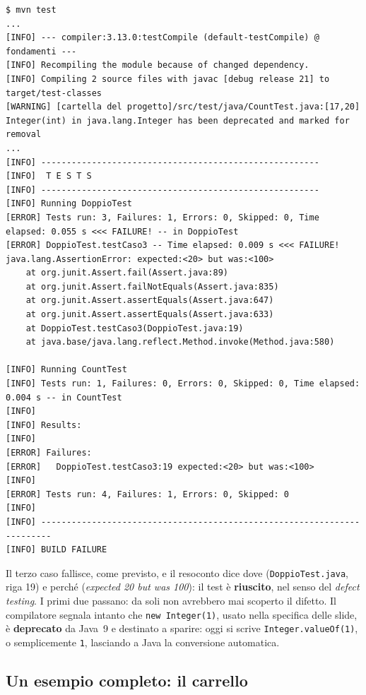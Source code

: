\begin{lstlisting}[style=shell, name=Terminale, deletekeywords={java}]
$ mvn test
...
[INFO] --- compiler:3.13.0:testCompile (default-testCompile) @ fondamenti ---
[INFO] Recompiling the module because of changed dependency.
[INFO] Compiling 2 source files with javac [debug release 21] to target/test-classes
[WARNING] [cartella del progetto]/src/test/java/CountTest.java:[17,20] Integer(int) in java.lang.Integer has been deprecated and marked for removal
...
[INFO] -------------------------------------------------------
[INFO]  T E S T S
[INFO] -------------------------------------------------------
[INFO] Running DoppioTest
[ERROR] Tests run: 3, Failures: 1, Errors: 0, Skipped: 0, Time elapsed: 0.055 s <<< FAILURE! -- in DoppioTest
[ERROR] DoppioTest.testCaso3 -- Time elapsed: 0.009 s <<< FAILURE!
java.lang.AssertionError: expected:<20> but was:<100>
    at org.junit.Assert.fail(Assert.java:89)
    at org.junit.Assert.failNotEquals(Assert.java:835)
    at org.junit.Assert.assertEquals(Assert.java:647)
    at org.junit.Assert.assertEquals(Assert.java:633)
    at DoppioTest.testCaso3(DoppioTest.java:19)
    at java.base/java.lang.reflect.Method.invoke(Method.java:580)

[INFO] Running CountTest
[INFO] Tests run: 1, Failures: 0, Errors: 0, Skipped: 0, Time elapsed: 0.004 s -- in CountTest
[INFO]
[INFO] Results:
[INFO]
[ERROR] Failures:
[ERROR]   DoppioTest.testCaso3:19 expected:<20> but was:<100>
[INFO]
[ERROR] Tests run: 4, Failures: 1, Errors: 0, Skipped: 0
[INFO]
[INFO] ------------------------------------------------------------------------
[INFO] BUILD FAILURE
\end{lstlisting}

Il terzo caso fallisce, come previsto, e il resoconto dice dove (\texttt{DoppioTest.java}, riga 19) e perché
(\textit{expected 20 but was 100}): il test è \textbf{riuscito}, nel senso del \textit{defect testing}. I primi due
passano: da soli non avrebbero mai scoperto il difetto. Il compilatore segnala intanto che \texttt{new Integer(1)}, usato
nella specifica delle slide, è \textbf{deprecato} da Java~9 e destinato a sparire: oggi si scrive
\texttt{Integer.valueOf(1)}, o semplicemente \texttt{1}, lasciando a Java la conversione automatica.

\subsection{Un esempio completo: il carrello}

